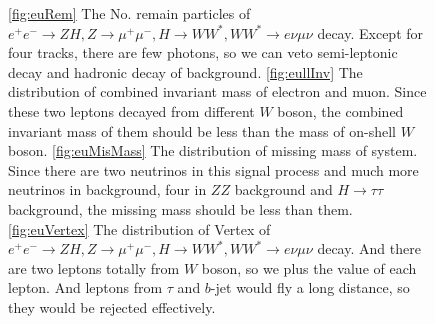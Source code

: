 \documentclass[11pt,a4paper]{cepcnote}
\begin{document}
\begin{figure}[H]
\centering
	\caption[]{
		\ref{fig:euRem} The No. remain particles of $e^+e^-\rightarrow ZH, Z\rightarrow\mu^+\mu^-, H\rightarrow WW^*,  
		WW^*\rightarrow e\nu\mu\nu$ decay. Except for four tracks, there are few photons, so we can veto semi-leptonic decay
		and hadronic decay of background.
		\ref{fig:eullInv} The distribution of combined invariant mass of electron and muon. 
		Since these two leptons decayed from different $W$ boson, the combined invariant mass of them 
		should be less than the mass of on-shell $W$ boson.
		\ref{fig:euMisMass} The distribution of missing mass of system. Since there are two neutrinos in this signal process 
		and much more neutrinos in background, four in $ZZ$ background and $H\to\tau\tau$ background, the missing mass should 
		be less than them.
		\ref{fig:euVertex} The distribution of Vertex of $e^+e^-\rightarrow ZH, Z\rightarrow\mu^+\mu^-, H\rightarrow WW^*, 
		WW^*\rightarrow e\nu\mu\nu$ decay. And there are two leptons totally from $W$ boson, so we plus the value of each lepton.
		And leptons from $\tau$ and $b$-jet would fly a long distance, so they would be rejected effectively.}
	\label{fig:euRemandVertex}
\end{figure}
\end{document}
